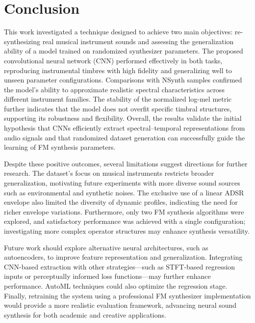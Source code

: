 \documentclass[10pt,conference]{IEEEtran}
\begin{document}
\section{Conclusion} \label{sec:conclusion}

This work investigated a technique designed to achieve two main objectives: re-synthesizing real musical instrument sounds and assessing the generalization ability of a model trained on randomized synthesizer parameters. The proposed convolutional neural network (CNN) performed effectively in both tasks, reproducing instrumental timbres with high fidelity and generalizing well to unseen parameter configurations. Comparisons with NSynth samples confirmed the model’s ability to approximate realistic spectral characteristics across different instrument families. The stability of the normalized log-mel metric further indicates that the model does not overfit specific timbral structures, supporting its robustness and flexibility. Overall, the results validate the initial hypothesis that CNNs efficiently extract spectral–temporal representations from audio signals and that randomized dataset generation can successfully guide the learning of FM synthesis parameters.

Despite these positive outcomes, several limitations suggest directions for further research. The dataset’s focus on musical instruments restricts broader generalization, motivating future experiments with more diverse sound sources such as environmental and synthetic noises. The exclusive use of a linear ADSR envelope also limited the diversity of dynamic profiles, indicating the need for richer envelope variations. Furthermore, only two FM synthesis algorithms were explored, and satisfactory performance was achieved with a single configuration; investigating more complex operator structures may enhance synthesis versatility.

Future work should explore alternative neural architectures, such as autoencoders, to improve feature representation and generalization. Integrating CNN-based extraction with other strategies—such as STFT-based regression inputs or perceptually informed loss functions—may further enhance performance. AutoML techniques could also optimize the regression stage. Finally, retraining the system using a professional FM synthesizer implementation would provide a more realistic evaluation framework, advancing neural sound synthesis for both academic and creative applications.




\end{document}
